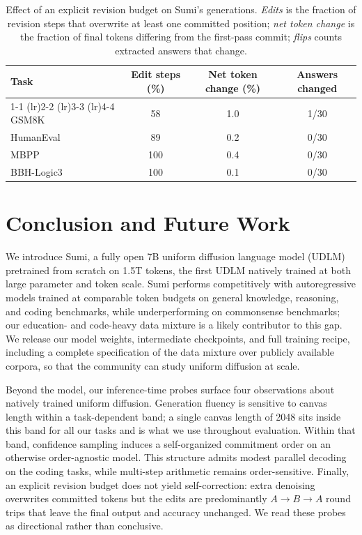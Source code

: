 \documentclass[11pt, a4paper]{style}
\begin{document}
\begin{table}[t]
\centering
\caption{Effect of an explicit revision budget on Sumi's generations. \emph{Edits} is the fraction of revision steps that overwrite at least one committed position; \emph{net token change} is the fraction of final tokens differing from the first-pass commit; \emph{flips} counts extracted answers that change.}
\label{tab:revision}
\begin{tabular}{lccc}
\toprule
Task & Edit steps (\%) & Net token change (\%) & Answers changed \\
\cmidrule(lr){1-1} \cmidrule(lr){2-2} \cmidrule(lr){3-3} \cmidrule(lr){4-4}
GSM8K      & 58  & 1.0 & 1/30  \\
HumanEval  & 89  & 0.2 & 0/30  \\
MBPP       & 100 & 0.4 & 0/30  \\
BBH-Logic3 & 100 & 0.1 & 0/30  \\
\bottomrule
\end{tabular}
\end{table}






\section{Conclusion and Future Work}
\label{sec:conclusion}
We introduce Sumi, a fully open 7B uniform diffusion language model (UDLM)
pretrained from scratch on 1.5T tokens, the first UDLM natively trained at both
large parameter and token scale.
Sumi performs competitively with autoregressive models trained at comparable
token budgets on general knowledge, reasoning, and coding benchmarks, while
underperforming on commonsense benchmarks; our education- and code-heavy data
mixture is a likely contributor to this gap.
We release our model weights, intermediate checkpoints, and full training recipe,
including a complete specification of the data mixture over publicly available
corpora, so that the community can study uniform diffusion at scale.

Beyond the model, our inference-time probes surface four observations about
natively trained uniform diffusion.
Generation fluency is sensitive to canvas length within a task-dependent band; a
single canvas length of 2048 sits inside this band for all our tasks and is what
we use throughout evaluation.
Within that band, confidence sampling induces a self-organized commitment order
on an otherwise order-agnostic model.
This structure admits modest parallel decoding on the coding tasks, while
multi-step arithmetic remains order-sensitive. Finally, an explicit revision
budget does not yield self-correction: extra denoising overwrites committed
tokens but the edits are predominantly $A \to B \to A$ round trips that leave the
final output and accuracy unchanged.
We read these probes as directional rather than conclusive.
\end{document}
